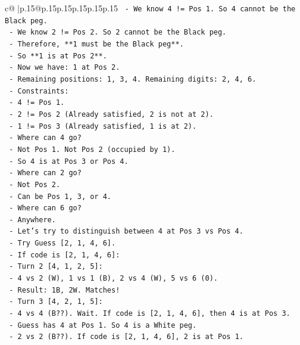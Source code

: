 \documentclass{article}
\begin{document}
{\begin{supertabular}{c@{$\;$}|p{.15\linewidth}@{}p{.15\linewidth}p{.15\linewidth}p{.15\linewidth}p{.15\linewidth}p{.15\linewidth}}
{{{\texttt{      {-} We know 4 != Pos 1. So 4 cannot be the Black peg.} \\
\texttt{      {-} We know 2 != Pos 2. So 2 cannot be the Black peg.} \\
\texttt{      {-} Therefore, **1 must be the Black peg**.} \\
\texttt{      {-} So **1 is at Pos 2**.} \\
\texttt{    {-} Now we have: 1 at Pos 2.} \\
\texttt{    {-} Remaining positions: 1, 3, 4. Remaining digits: 2, 4, 6.} \\
\texttt{    {-} Constraints:} \\
\texttt{      {-} 4 != Pos 1.} \\
\texttt{      {-} 2 != Pos 2 (Already satisfied, 2 is not at 2).} \\
\texttt{      {-} 1 != Pos 3 (Already satisfied, 1 is at 2).} \\
\texttt{    {-} Where can 4 go?} \\
\texttt{      {-} Not Pos 1. Not Pos 2 (occupied by 1).} \\
\texttt{      {-} So 4 is at Pos 3 or Pos 4.} \\
\texttt{    {-} Where can 2 go?} \\
\texttt{      {-} Not Pos 2.} \\
\texttt{      {-} Can be Pos 1, 3, or 4.} \\
\texttt{    {-} Where can 6 go?} \\
\texttt{      {-} Anywhere.} \\
\texttt{    {-} Let's try to distinguish between 4 at Pos 3 vs Pos 4.} \\
\texttt{    {-} Try Guess {[}2, 1, 4, 6{]}.} \\
\texttt{      {-} If code is {[}2, 1, 4, 6{]}:} \\
\texttt{        {-} Turn 2 {[}4, 1, 2, 5{]}:} \\
\texttt{          {-} 4 vs 2 (W), 1 vs 1 (B), 2 vs 4 (W), 5 vs 6 (0).} \\
\texttt{          {-} Result: 1B, 2W. Matches!} \\
\texttt{        {-} Turn 3 {[}4, 2, 1, 5{]}:} \\
\texttt{          {-} 4 vs 4 (B??). Wait. If code is {[}2, 1, 4, 6{]}, then 4 is at Pos 3.} \\
\texttt{          {-} Guess has 4 at Pos 1. So 4 is a White peg.} \\
\texttt{          {-} 2 vs 2 (B??). If code is {[}2, 1, 4, 6{]}, 2 is at Pos 1.} \\
}}}
\end{supertabular}}
\end{document}
